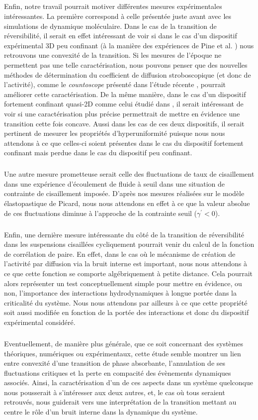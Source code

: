 \subparagraph{}Enfin, notre travail pourrait motiver différentes mesures expérimentales intéressantes. La première correspond à celle présentée juste avant avec les simulations de dynamique moléculaire. Dans le cas de la transition de réversibilité, il serait en effet intéressant de voir si dans le cas d'un dispositif expérimental 3D peu confinant (à la manière des expériences de Pine et al. \cite{pine_chaos_2005}) nous retrouvons une convexité de la transition. Si les mesures de l'époque ne permettent pas une telle caractérisation, nous pouvons penser que des nouvelles méthodes de détermination du coefficient de diffusion stroboscopique (et donc de l'activité), comme le \textit{countoscope} présenté dans l'étude récente \cite{mackay_countoscope_2024}, pourrait améliorer cette caractérisation. De la même manière, dans le cas d'un dispositif fortement confinant quasi-2D comme celui étudié dans \cite{jeanneret_geometrically_2014, weijs_emergent_2015}, il serait intéressant de voir si une caractérisation plus précise permettrait de mettre en évidence une transition cette fois concave. Aussi dans les cas de ces deux dispositifs, il serait pertinent de mesurer les propriétés d'hyperuniformité puisque nous nous attendons à ce que celles-ci soient présentes dans le cas du dispositif fortement confinant mais perdue dans le cas du dispositif peu confinant.

\subparagraph{}Une autre mesure prometteuse serait celle des fluctuations de taux de cisaillement dans une expérience d'écoulement de fluide à seuil dans une situation de contrainte de cisaillement imposée. D'après nos mesures réalisées sur le modèle élastopastique de Picard, nous nous attendons en effet à ce que la valeur absolue de ces fluctuations diminue à l'approche de la contrainte seuil ($\gamma^\prime < 0$).

\subparagraph{}Enfin, une dernière mesure intéressante du côté de la transition de réversibilité dans les suspensions cisaillées cycliquement pourrait venir du calcul de la fonction de corrélation de paire. En effet, dans le cas où le mécanisme de création de l'activité par diffusion via la bruit interne est important, nous nous attendons à ce que cette fonction se comporte algébriquement à petite distance. Cela pourrait alors représenter un test conceptuellement simple pour mettre en évidence, ou non, l'importance des interactions hydrodynamiques à longue portée dans la criticalité du système. Nous nous attendons par ailleurs à ce que cette propriété soit aussi modifiée en fonction de la portée des interactions et donc du dispositif expérimental considéré.

\subparagraph{}Eventuellement, de manière plus générale, que ce soit concernant des systèmes théoriques, numériques ou expérimentaux, cette étude semble montrer un lien entre convexité d'une transition de phase absorbante, l'annulation de ses fluctuations critiques et la perte en compacité des évènements dynamiques associés. Ainsi, la caractérisation d'un de ces aspects dans un système quelconque nous pousserait à s'intéresser aux deux autres, et, le cas où tous seraient retrouvés, nous guiderait vers une interprétation de la transition mettant au centre le rôle d'un bruit interne dans la dynamique du système.

